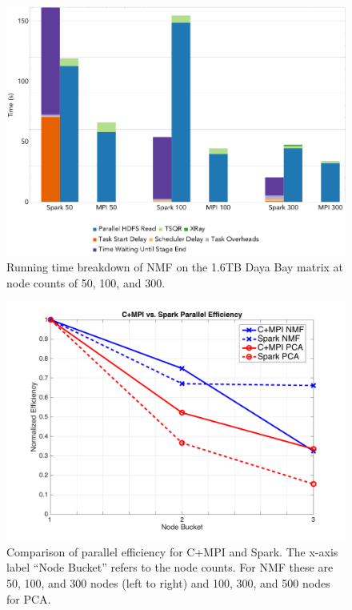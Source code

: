 



\begin{figure}[th!]
\begin{center}
\includegraphics[width=\textwidth]{fig/nmf_run_times.png}
\caption{Running time breakdown of NMF on the 1.6TB Daya Bay matrix at 
node counts of 50, 100, and 300.}
\label{fig:nmfrt}
\end{center}
\end{figure}

\begin{figure}[h]
\centering
\includegraphics[width=\textwidth]{fig/peff.png}
\caption{Comparison of parallel efficiency for C+MPI and Spark. The x-axis label ``Node Bucket'' refers to the node counts. For NMF these are 50, 100, and 300 nodes (left to right) and 100, 300, and 500 nodes for PCA.}
\label{fig:peff}
\end{figure}

